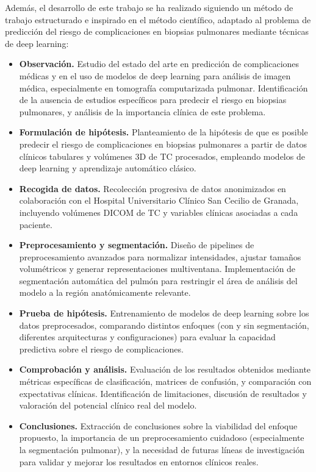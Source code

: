 Además, el desarrollo de este trabajo se ha realizado siguiendo un método de trabajo estructurado e inspirado en el método científico, adaptado al problema de predicción del riesgo de complicaciones en biopsias pulmonares mediante técnicas de deep learning:

\begin{itemize}
    \item \textbf{Observación.} Estudio del estado del arte en predicción de complicaciones médicas y en el uso de modelos de deep learning para análisis de imagen médica, especialmente en tomografía computarizada pulmonar. Identificación de la ausencia de estudios específicos para predecir el riesgo en biopsias pulmonares, y análisis de la importancia clínica de este problema.
    
    \item \textbf{Formulación de hipótesis.} Planteamiento de la hipótesis de que es posible predecir el riesgo de complicaciones en biopsias pulmonares a partir de datos clínicos tabulares y volúmenes 3D de TC procesados, empleando modelos de deep learning y aprendizaje automático clásico.
    
    \item \textbf{Recogida de datos.} Recolección progresiva de datos anonimizados en colaboración con el Hospital Universitario Clínico San Cecilio de Granada, incluyendo volúmenes DICOM de TC y variables clínicas asociadas a cada paciente. 
    
    \item \textbf{Preprocesamiento y segmentación.} Diseño de pipelines de preprocesamiento avanzados para normalizar intensidades, ajustar tamaños volumétricos y generar representaciones multiventana. Implementación de segmentación automática del pulmón para restringir el área de análisis del modelo a la región anatómicamente relevante.
    
    \item \textbf{Prueba de hipótesis.} Entrenamiento de modelos de deep learning sobre los datos preprocesados, comparando distintos enfoques (con y sin segmentación, diferentes arquitecturas y configuraciones) para evaluar la capacidad predictiva sobre el riesgo de complicaciones.
    
    \item \textbf{Comprobación y análisis.} Evaluación de los resultados obtenidos mediante métricas específicas de clasificación, matrices de confusión, y comparación con expectativas clínicas. Identificación de limitaciones, discusión de resultados y valoración del potencial clínico real del modelo.
    
    \item \textbf{Conclusiones.} Extracción de conclusiones sobre la viabilidad del enfoque propuesto, la importancia de un preprocesamiento cuidadoso (especialmente la segmentación pulmonar), y la necesidad de futuras líneas de investigación para validar y mejorar los resultados en entornos clínicos reales.
\end{itemize}


